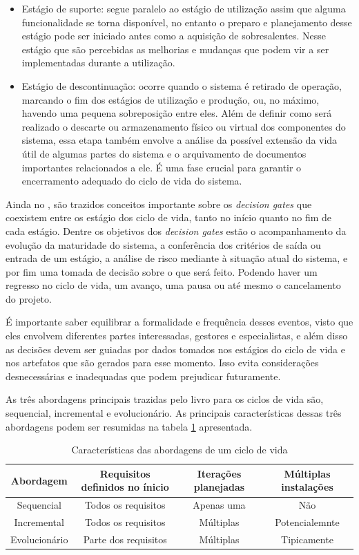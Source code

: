 \begin{itemize}
		\item Estágio de suporte: segue paralelo ao estágio de utilização assim que alguma funcionalidade se torna disponível, no entanto o preparo e 
		planejamento desse estágio pode ser iniciado antes como a aquisição de sobresalentes. Nesse estágio que são percebidas as melhorias e mudanças que 
		podem vir a ser implementadas durante a utilização.
		\item Estágio de descontinuação: ocorre quando o sistema é retirado de operação, marcando o fim dos estágios de utilização e produção, ou, no máximo, 
		havendo uma pequena sobreposição entre eles. Além de definir como será realizado o descarte ou armazenamento físico ou virtual dos componentes do sistema, essa etapa 
		também envolve a análise da possível extensão da vida útil de algumas partes do sistema e o arquivamento de documentos importantes relacionados a ele.
		É uma fase crucial para garantir o encerramento adequado do ciclo de vida do sistema.
	\end{itemize}
	
	Ainda no \cite{incoseHandbook}, são trazidos conceitos importante sobre os \textit{decision gates} que coexistem entre os estágio dos ciclo de vida, tanto no início quanto no fim de cada estágio.
	Dentre os objetivos dos \textit{decision gates} estão o acompanhamento da evolução da maturidade do sistema, a conferência dos critérios de saída ou entrada de um estágio,
	a análise de risco mediante à situação atual do sistema, e por fim uma tomada de decisão sobre o que será feito. Podendo haver um regresso no ciclo de vida, um avanço, uma pausa 
	ou até mesmo o cancelamento do projeto.

	É importante saber equilibrar a formalidade e frequência desses eventos, visto que eles envolvem diferentes partes interessadas, gestores e especialistas, e além disso as
	decisões devem ser guiadas por dados tomados nos estágios do ciclo de vida e nos artefatos que são gerados para esse momento. Isso evita considerações desnecessárias e 
	inadequadas que podem prejudicar futuramente.

	As três abordagens principais trazidas pelo livro para os ciclos de vida são, sequencial, incremental e evolucionário. As principais características dessas três abordagens
	podem ser resumidas na tabela \ref{tab:revisao:ciclodevida:abordagens} apresentada.

	\begin{table}[!h]
		\centering
		\caption{Características das abordagens de um ciclo de vida}
		\begin{tabular}{cccc}
			\hline
			Abordagem & Requisitos definidos no ínicio & Iterações planejadas & Múltiplas instalações \\
			\hline
			Sequencial & Todos os requisitos & Apenas uma & Não\\
			Incremental & Todos os requisitos & Múltiplas & Potencialemnte\\
			Evolucionário & Parte dos requisitos & Múltiplas & Tipicamente\\
			\hline
		\end{tabular}
		\label{tab:revisao:ciclodevida:abordagens}
	\end{table}

